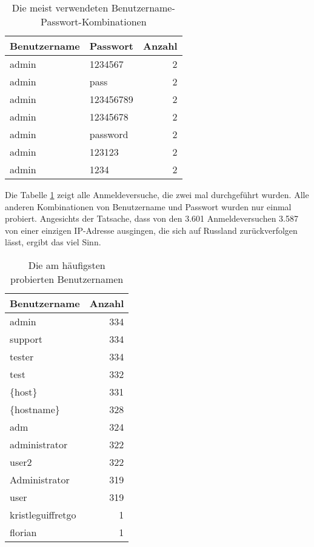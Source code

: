 \begin{table}[h]
  \begin{tabular}{ l|l|r }
    \textbf{Benutzername} & \textbf{Passwort} & \textbf{Anzahl}\\
    \hline
    admin & 1234567 & 2 \\
    admin & pass & 2 \\
    admin & 123456789 & 2 \\
    admin & 12345678 & 2 \\
    admin & password & 2 \\
    admin & 123123 & 2 \\
    admin & 1234 & 2 \\
  \end{tabular}
  
  \caption{Die meist verwendeten Benutzername-Passwort-Kombinationen}
  \label{tab:maxUserPass}
\end{table}

Die Tabelle \ref{tab:maxUserPass} zeigt alle Anmeldeversuche, die zwei mal
durchgeführt wurden. Alle anderen Kombinationen von Benutzername und Passwort
wurden nur einmal probiert. Angesichts der Tatsache, dass
von den 3.601 Anmeldeversuchen 3.587 von einer einzigen IP-Adresse ausgingen,
die sich auf Russland zurückverfolgen lässt, ergibt das viel Sinn.

\begin{table}[h]
  \begin{tabular}{ l|r }
    \textbf{Benutzername} & \textbf{Anzahl}\\
    \hline
    admin & 334 \\
    support & 334 \\
    tester & 334 \\
    test & 332 \\
    \{host\} & 331 \\
    \{hostname\} & 328 \\
    adm & 324 \\
    administrator & 322 \\
    user2 & 322 \\
    Administrator & 319 \\
    user & 319 \\
    kristleguiffretgo & 1 \\
    florian & 1 \\
  \end{tabular}
  
  \caption{Die am häufigsten probierten Benutzernamen}
  \label{tab:maxUsername}
\end{table}

